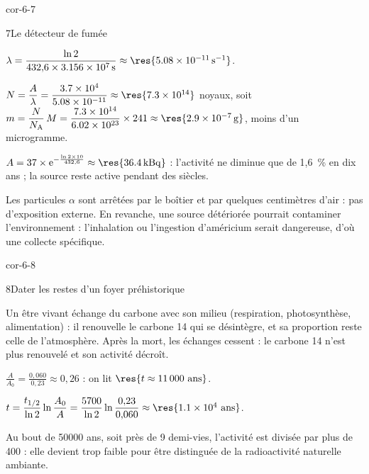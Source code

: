 \begin{blocLivre}{cor-6-7}
\begin{corrige}{7}{Le détecteur de fumée}
\begin{questions}
\item $\lambda=\dfrac{\ln2}{432{,}6\times\qty{3,156e7}{s}}\approx\res{\qty{5,08e-11}{s^{-1}}}$.
\item $N=\dfrac{A}{\lambda}=\dfrac{\num{3.7e4}}{\num{5.08e-11}}\approx\res{\num{7.3e14}}$ noyaux, soit
$m=\dfrac{N}{N_\mathrm{A}}\,M=\dfrac{\num{7.3e14}}{\num{6.02e23}}\times241\approx\res{\qty{2,9e-7}{g}}$, moins d'un microgramme.
\item $A=37\times\mathrm{e}^{-\frac{\ln2\times10}{432{,}6}}\approx\res{\qty{36,4}{kBq}}$ : l'activité ne diminue que de
1,6~\% en dix ans ; la source reste active pendant des siècles.
\item Les particules $\alpha$ sont arrêtées par le boîtier et par quelques centimètres d'air : pas d'exposition
externe. En revanche, une source détériorée pourrait contaminer l'environnement : l'inhalation ou l'ingestion
d'américium serait dangereuse, d'où une collecte spécifique.
\end{questions}
\end{corrige}
\end{blocLivre}
\begin{blocLivre}{cor-6-8}
\begin{corrige}{8}{Dater les restes d'un foyer préhistorique}
\begin{questions}
\item Un être vivant échange du carbone avec son milieu (respiration, photosynthèse, alimentation) : il renouvelle
le carbone 14 qui se désintègre, et sa proportion reste celle de l'atmosphère. Après la mort, les échanges cessent :
le carbone 14 n'est plus renouvelé et son activité décroît.
\item $\frac{A}{A_0}=\frac{0{,}060}{0{,}23}\approx0{,}26$ : on lit $\res{t\approx\num{11000}\text{ ans}}$.
\item $t=\dfrac{t_{1/2}}{\ln2}\ln\dfrac{A_0}{A}=\dfrac{\num{5700}}{\ln2}\ln\dfrac{0{,}23}{0{,}060}\approx\res{\num{1.1e4}\text{ ans}}$.
\item Au bout de \num{50000} ans, soit près de 9 demi-vies, l'activité est divisée par plus de 400 : elle devient
trop faible pour être distinguée de la radioactivité naturelle ambiante.
\end{questions}
\end{corrige}
\end{blocLivre}
